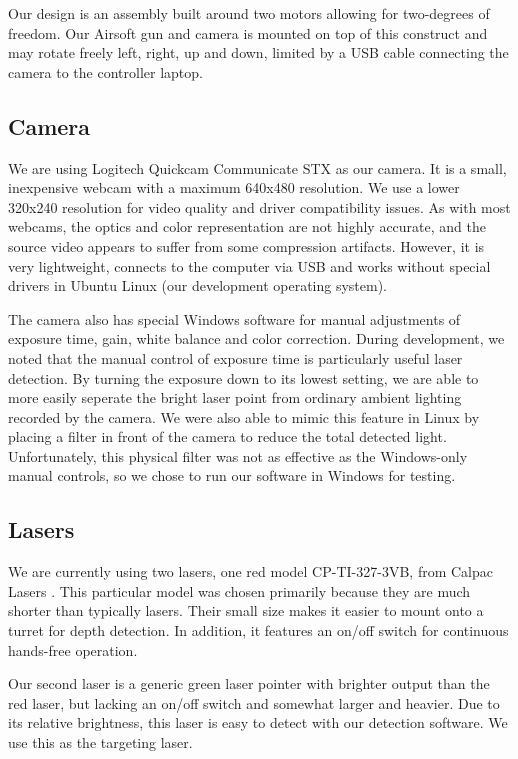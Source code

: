 \documentclass[10pt,twocolumn,letterpaper]{article}
\begin{document}
Our design is an assembly built around two motors allowing for two-degrees of freedom. Our Airsoft gun and camera is mounted on top of this construct and may rotate freely left, right, up and down, limited by a USB cable connecting the camera to the controller laptop.
 
\subsection{Camera}

We are using Logitech Quickcam Communicate STX \cite{logi} as our camera.  It is a small, inexpensive webcam with a maximum 640x480 resolution.  We use a lower 320x240 resolution for video quality and driver compatibility issues.  As with most webcams, the optics and color representation are not highly accurate, and the source video appears to suffer from some compression artifacts.  However, it is very lightweight, connects to the computer via USB and works without special drivers in Ubuntu Linux (our development operating system).

The camera also has special Windows software for manual adjustments of exposure time, gain, white balance and color correction.  During development, we noted that the manual control of exposure time is particularly useful laser detection.  By turning the exposure down to its lowest setting, we are able to more easily seperate the bright laser point from ordinary ambient lighting recorded by the camera.  We were also able to mimic this feature in Linux by placing a filter in front of the camera to reduce the total detected light.  Unfortunately, this physical filter was not as effective as the Windows-only manual controls, so we chose to run our software in Windows for testing.

\subsection{Lasers}

We are currently using two lasers, one red model CP-TI-327-3VB, from Calpac Lasers \cite{calpac}.  This particular model was chosen primarily because they are much shorter than typically lasers.  Their small size makes it easier to mount onto a turret for depth detection.  In addition, it features an on/off switch for continuous hands-free operation.

Our second laser is a generic green laser pointer with brighter output than the red laser, but lacking an on/off switch and somewhat larger and heavier.  Due to its relative brightness, this laser is easy to detect with our detection software.  We use this as the targeting laser.
\end{document}
